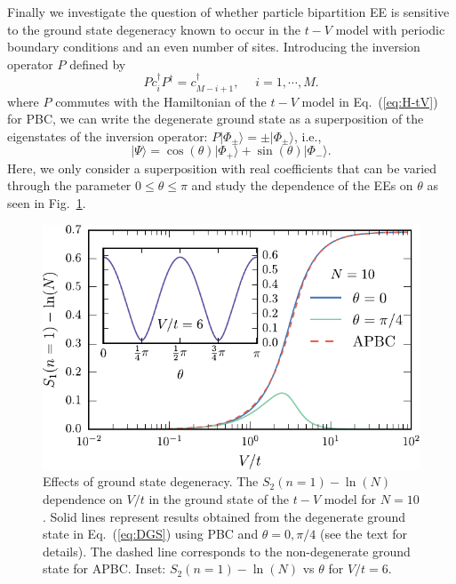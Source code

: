Finally we investigate the question of whether particle bipartition EE is
sensitive to the ground state degeneracy known to occur in the $t-V$
model with periodic boundary conditions and an even number of sites.
Introducing the inversion operator $P$ \cite{KampfSekania:2003} defined by
%
\begin{equation}
Pc^{\dagger}_{i}P^{\dagger}=c^{\dagger}_{M-i+1},
\quad \;i=1, \cdots, M.
\label{eq:inversion}
\end{equation}
%
where $P$ commutes with the Hamiltonian of the $t-V$ model in
Eq.~(\ref{eq:H-tV}) for PBC, we can write the degenerate ground state as a
superposition of the eigenstates of the inversion operator: $P\vert
\Phi_{\pm}\rangle=\pm\vert \Phi_{\pm}\rangle$, i.e.,
%
\begin{equation}
\vert \Psi\rangle=\cos(\theta) \vert \Phi_{+}\rangle+\sin(\theta) \vert \Phi_- \rangle. 
\label{eq:DGS}
\end{equation}
%
Here, we only consider a superposition with real coefficients that can be
varied through the parameter $0\leq\theta\leq\pi$ and study the 
dependence of the \ren EEs on $\theta$ as seen in Fig.~\ref{fig:Sthetadep}. 
%
\begin{figure}[h]
\begin{center}
\includegraphics[width=0.7\columnwidth]{Chapters/PPE_degenerate_state.pdf}
\end{center}
\caption{Effects of ground state degeneracy. The $S_2(n=1)-\ln(N)$ dependence
on $V/t$ in the ground state of the $t-V$ model for $N = 10$. Solid lines
represent results obtained from the degenerate ground state in
Eq.~(\ref{eq:DGS}) using PBC and $\theta=0,\pi/4$ (see the text for details).
The dashed line corresponds to the non-degenerate ground state for APBC. Inset:
$S_2(n=1)-\ln(N)$ vs $\theta$ for $V/t=6$.}
\label{fig:Sthetadep}
 \end{figure}
